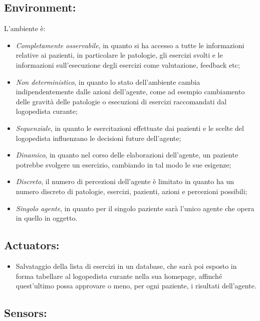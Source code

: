 \documentclass{article}
\begin{document}
    \subsection{Environment:}

    L’ambiente è:

    \begin{itemize}
        \item \textit{Completamente osservabile}, in quanto si ha accesso a tutte le informazioni relative ai pazienti, in particolare le patologie, gli esercizi svolti e le informazioni sull'esecuzione degli esercizi come valutazione, feedback etc;
        \item \textit{Non deterministico}, in quanto lo stato dell’ambiente cambia indipendentemente dalle azioni dell’agente, come ad esempio cambiamento delle gravità delle patologie o esecuzioni di esercizi raccomandati dal logopedista curante;
        \item \textit{Sequenziale}, in quanto le esercitazioni effettuate dai pazienti e le scelte del logopedista influenzano le decisioni future dell’agente;
        \item \textit{Dinamico}, in quanto nel corso delle elaborazioni dell’agente, un paziente potrebbe svolgere un esercizio, cambiando in tal modo le sue esigenze;
        \item \textit{Discreto}, il numero di percezioni dell’agente è limitato in quanto ha un numero discreto di patologie, esercizi, pazienti, azioni e percezioni possibili;
        \item \textit{Singolo agente}, in quanto per il singolo paziente sarà l'unico agente che opera in quello in oggetto.
    \end{itemize}

    \subsection{Actuators:}

    \begin{itemize}
        \item Salvataggio della lista di esercizi in un database, che sarà poi esposto in forma tabellare  al logopedista curante nella sua homepage, affinché quest'ultimo possa approvare o meno, per ogni paziente, i risultati dell'agente.
    \end{itemize}

    \subsection{Sensors:}
\end{document}
